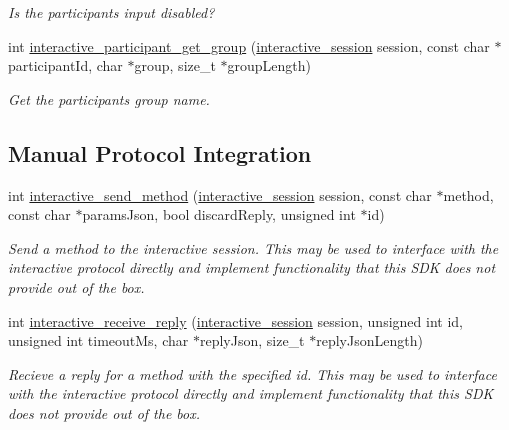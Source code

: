 \begin{DoxyCompactItemize}
\begin{DoxyCompactList}\small\item\em Is the participant\textquotesingle{}s input disabled? \end{DoxyCompactList}\item 
int \mbox{\hyperlink{group___interactivity_ga3a312c89bf461e7163d9e66bd16e80f4}{interactive\+\_\+participant\+\_\+get\+\_\+group}} (\mbox{\hyperlink{group___interactivity_ga6d8819d38b8dc8994a2299cf22a65a31}{interactive\+\_\+session}} session, const char $\ast$participant\+Id, char $\ast$group, size\+\_\+t $\ast$group\+Length)
\begin{DoxyCompactList}\small\item\em Get the participant\textquotesingle{}s group name. \end{DoxyCompactList}\end{DoxyCompactItemize}
\subsection*{Manual Protocol Integration}
\begin{DoxyCompactItemize}
\item 
int \mbox{\hyperlink{group___interactivity_gaf2aa764d771d2ec5f611023324c30214}{interactive\+\_\+send\+\_\+method}} (\mbox{\hyperlink{group___interactivity_ga6d8819d38b8dc8994a2299cf22a65a31}{interactive\+\_\+session}} session, const char $\ast$method, const char $\ast$params\+Json, bool discard\+Reply, unsigned int $\ast$id)
\begin{DoxyCompactList}\small\item\em Send a method to the interactive session. This may be used to interface with the interactive protocol directly and implement functionality that this S\+DK does not provide out of the box. \end{DoxyCompactList}\item 
int \mbox{\hyperlink{group___interactivity_ga7e441089be6e25051bcc4d4249bb1379}{interactive\+\_\+receive\+\_\+reply}} (\mbox{\hyperlink{group___interactivity_ga6d8819d38b8dc8994a2299cf22a65a31}{interactive\+\_\+session}} session, unsigned int id, unsigned int timeout\+Ms, char $\ast$reply\+Json, size\+\_\+t $\ast$reply\+Json\+Length)
\begin{DoxyCompactList}\small\item\em Recieve a reply for a method with the specified id. This may be used to interface with the interactive protocol directly and implement functionality that this S\+DK does not provide out of the box. \end{DoxyCompactList}\end{DoxyCompactItemize}
